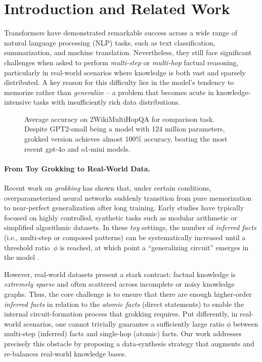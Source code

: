 \section{Introduction and Related Work} \label{sec:intro}

    Transformers have demonstrated remarkable success across a wide range of natural language processing (NLP) tasks, such as text classification, summarization, and machine translation. Nevertheless, they still face significant challenges when asked to perform \emph{multi-step} or \emph{multi-hop} factual reasoning, particularly in real-world scenarios where knowledge is both vast and sparsely distributed. A key reason for this difficulty lies in the model’s tendency to memorize rather than \emph{generalize} -- a problem that becomes acute in knowledge-intensive tasks with insufficiently rich data distributions.

    \begin{figure}[h]
        \centering
        
         \vspace{-24pt} %
        \caption{Average accuracy on 2WikiMultiHopQA for comparison task. Despite GPT2-small being a model with 124 million parameters, grokked version achieves almost 100\% accuracy, beating the most recent gpt-4o and o1-mini models.}
        \label{fig:introduction_accuracy}
    \end{figure}
    
    \paragraph{From Toy Grokking to Real-World Data.} 
        Recent work on \emph{grokking} \citep{power2022grokking} has shown that, under certain conditions, overparameterized neural networks suddenly transition from pure memorization to near-perfect generalization after long training. Early studies have typically focused on highly controlled, synthetic tasks such as modular arithmetic or simplified algorithmic datasets. In these \emph{toy} settings, the number of \emph{inferred facts} (i.e., multi-step or composed patterns) can be systematically increased until a threshold ratio~$\phi$ is reached, at which point a ``generalizing circuit'' emerges in the model \citep{belkin2019reconciling, nakkiran2020deepdouble, thilak2022slingshot, humayun2023dynamics, nanda2023progress}. 
    
        However, real-world datasets present a stark contrast: factual knowledge is \emph{extremely sparse} and often scattered across incomplete or noisy knowledge graphs. Thus, the core challenge is to ensure that there are enough higher-order \emph{inferred facts} in relation to the \emph{atomic facts} (direct statements) to enable the internal circuit-formation process that grokking requires. Put differently, in real-world scenarios, one cannot trivially guarantee a sufficiently large ratio $\phi$ between multi-step (inferred) facts and single-hop (atomic) facts. Our work addresses precisely this obstacle by proposing a data-synthesis strategy that augments and re-balances real-world knowledge bases.
    
